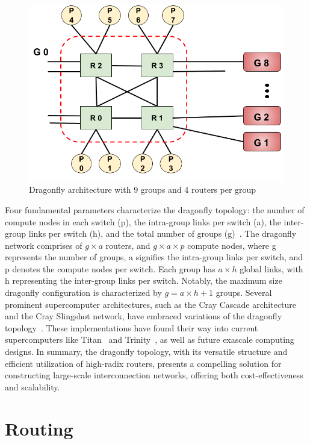 \begin{figure}[h!]
  \centering
  \includegraphics[width=0.8\columnwidth]{figs/dfly1.png}
  \caption{Dragonfly architecture with 9 groups and 4 routers per group}
  \label{fig:dfly}
\end{figure}


Four fundamental parameters characterize the dragonfly topology: the number of compute nodes in each switch (p), the intra-group links per switch (a), the
inter-group links per switch (h), and the total number of groups (g)~\cite{kim2008technology}. 
The dragonfly network comprises of $g \times a$
 routers, and $g \times a \times p$ compute nodes, where g represents the
number of groups, a signifies the intra-group links per switch, and p
denotes the compute nodes per switch. Each group has $a \times h$ global links, with
h representing the inter-group links per switch. Notably, the maximum size
dragonfly configuration is characterized by $g = a \times h + 1$ groups. 
Several prominent supercomputer
architectures, such as the Cray Cascade architecture and the Cray Slingshot
network, have embraced variations of the dragonfly topology~\cite{faanes2012cray, de2020depth}. These
implementations have found their way into current supercomputers like Titan~\cite{titan} and
Trinity~\cite{archer2015trinity}, as well as future exascale computing designs.  In summary, the
dragonfly topology, with its versatile structure and efficient utilization of
high-radix routers, presents a compelling solution for constructing large-scale
interconnection networks, offering both cost-effectiveness and scalability.

\section{Routing}

